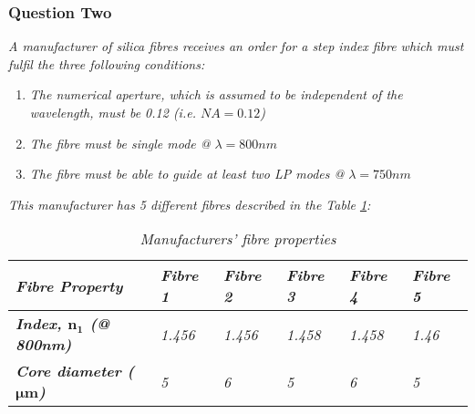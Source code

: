 \documentclass[colorlinks,11pt,a4paper,normalphoto,withhyper,ragged2e]{altareport}
\begin{document}
\newpage




\subsubsection{Question Two}
\textit{A manufacturer of silica fibres receives an order for a step index fibre which must fulfil the three following conditions:}

\begin{enumerate}[leftmargin=1cm, label={\textit{\bfseries C\arabic*:}}]
	\item \textit{The numerical aperture, which is assumed to be independent of the wavelength, must be 0.12 (i.e. $NA=0.12$)}
	\item \textit{The fibre must be single mode @ $\lambda = 800 nm$}
	\item \textit{The fibre must be able to guide at least two LP modes @  $\lambda = 750 nm$}
\end{enumerate}

\medskip

\textit{This manufacturer has 5 different fibres described in the Table \ref{tab:manufacturers_fibre}: }

\smallskip

\begin{table}[h!]
    \centering
    \def\arraystretch{1.5}%
    \begin{tabular}{|p{3.5cm}|p{2cm}|p{2cm}|p{2cm}|p{2cm}|p{2cm}|}
    	\hline
    	
        \textit{\textbf{Fibre Property}} & \textit{\textbf{Fibre 1}} & \textit{\textbf{Fibre 2}} & \textit{\textbf{Fibre 3}} & \textit{\textbf{Fibre 4}} & \textit{\textbf{Fibre 5}} \\
        
        \hline
        
        \textit{\textbf{Index, $\textbf{n}_{\textbf{1}}$ (@ 800nm)}} & \textit{1.456} & \textit{1.456} & \textit{1.458} & \textit{1.458} & \textit{1.46} \\
        
        \hline
        
        \textit{\textbf{Core diameter ($\boldsymbol{\mu} \textbf{m}$)}} & \textit{5} & \textit{6} & \textit{5} & \textit{6} & \textit{5} \\
        
		\hline
    \end{tabular}
    \caption{\textit{Manufacturers' fibre properties}}
    \label{tab:manufacturers_fibre}
\end{table}
\end{document}
